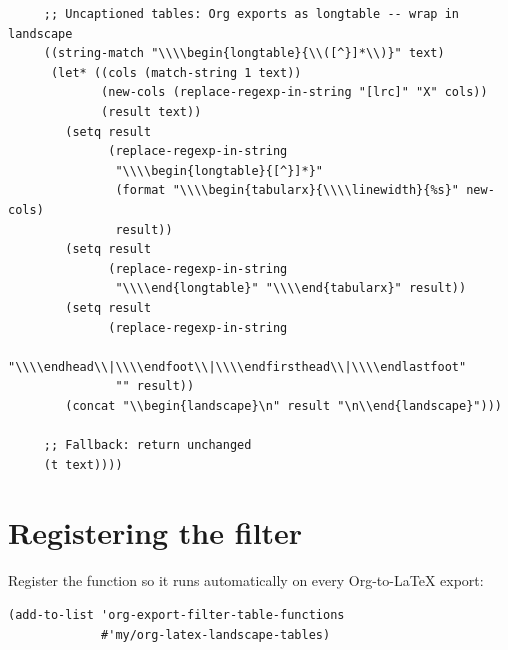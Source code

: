 \begin{verbatim}
     ;; Uncaptioned tables: Org exports as longtable -- wrap in landscape
     ((string-match "\\\\begin{longtable}{\\([^}]*\\)}" text)
      (let* ((cols (match-string 1 text))
             (new-cols (replace-regexp-in-string "[lrc]" "X" cols))
             (result text))
        (setq result
              (replace-regexp-in-string
               "\\\\begin{longtable}{[^}]*}"
               (format "\\\\begin{tabularx}{\\\\linewidth}{%s}" new-cols)
               result))
        (setq result
              (replace-regexp-in-string
               "\\\\end{longtable}" "\\\\end{tabularx}" result))
        (setq result
              (replace-regexp-in-string
               "\\\\endhead\\|\\\\endfoot\\|\\\\endfirsthead\\|\\\\endlastfoot"
               "" result))
        (concat "\\begin{landscape}\n" result "\n\\end{landscape}")))

     ;; Fallback: return unchanged
     (t text))))
\end{verbatim}

\section{Registering the filter}

Register the function so it runs automatically on every Org-to-\LaTeX{}
export:

\begin{verbatim}
(add-to-list 'org-export-filter-table-functions
             #'my/org-latex-landscape-tables)
\end{verbatim}

